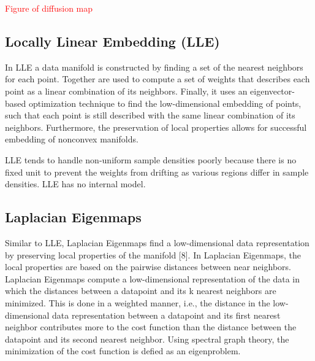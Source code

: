\textcolor{red}{Figure of diffusion map}


\subsection{Locally Linear Embedding (LLE)}
In LLE a data manifold is constructed by finding a set of the nearest neighbors for each point. Together are used to compute a set of weights that describes each point as a linear combination of its neighbors.
Finally, it uses an eigenvector-based optimization technique to find the low-dimensional embedding of points, such that each point is still described with the same linear combination of its neighbors. 
Furthermore, the preservation of local properties allows for successful embedding of nonconvex manifolds.

LLE tends to handle non-uniform sample densities poorly because there is no fixed unit to prevent the weights from drifting as various regions differ in sample densities. LLE has no internal model.




\subsection{Laplacian Eigenmaps}
Similar to LLE, Laplacian Eigenmaps find a low-dimensional data representation by preserving local properties of the
manifold [8]. In Laplacian Eigenmaps, the local properties are based on the pairwise distances between near neighbors.
Laplacian Eigenmaps compute a low-dimensional representation of the data in which the distances between a datapoint
and its k nearest neighbors are minimized. This is done in a weighted manner, i.e., the distance in the low-dimensional
data representation between a datapoint and its first nearest neighbor contributes more to the cost function than the
distance between the datapoint and its second nearest neighbor. Using spectral graph theory, the minimization of the
cost function is defied as an eigenproblem.

